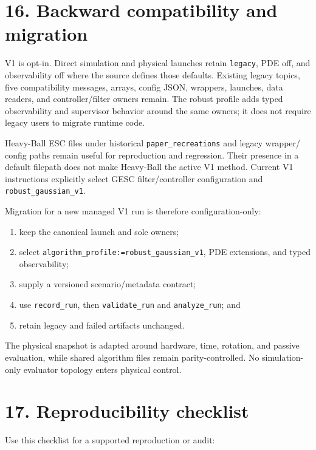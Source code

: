 \documentclass[
  10pt,
  letterpaper,
]{article}
\providecommand{\tightlist}{%
  \setlength{\itemsep}{0pt}\setlength{\parskip}{0pt}}
\begin{document}
\section{16. Backward compatibility and migration}\label{backward-compatibility-and-migration}

V1 is opt-in. Direct simulation and physical launches retain \nolinkurl{legacy}, PDE
off, and observability off where the source defines those defaults. Existing
legacy topics, five compatibility messages, arrays, config JSON, wrappers,
launches, data readers, and controller/filter owners remain. The robust profile
adds typed observability and supervisor behavior around the same owners; it
does not require legacy users to migrate runtime code.

Heavy-Ball ESC files under historical \nolinkurl{paper\_recreations} and legacy wrapper/
config paths remain useful for reproduction and regression. Their presence in
a default filepath does not make Heavy-Ball the active V1 method. Current V1
instructions explicitly select GESC filter/controller configuration and
\nolinkurl{robust\_gaussian\_v1}.

Migration for a new managed V1 run is therefore configuration-only:

\begin{enumerate}
\def\labelenumi{\arabic{enumi}.}
\tightlist
\item
  keep the canonical launch and sole owners;
\item
  select \nolinkurl{algorithm\_profile:=robust\_gaussian\_v1}, PDE extensions, and typed
  observability;
\item
  supply a versioned scenario/metadata contract;
\item
  use \nolinkurl{record\_run}, then \nolinkurl{validate\_run} and \nolinkurl{analyze\_run}; and
\item
  retain legacy and failed artifacts unchanged.
\end{enumerate}

The physical snapshot is adapted around hardware, time, rotation, and passive
evaluation, while shared algorithm files remain parity-controlled. No
simulation-only evaluator topology enters physical control.

\section{17. Reproducibility checklist}\label{reproducibility-checklist}

Use this checklist for a supported reproduction or audit:
\end{document}

